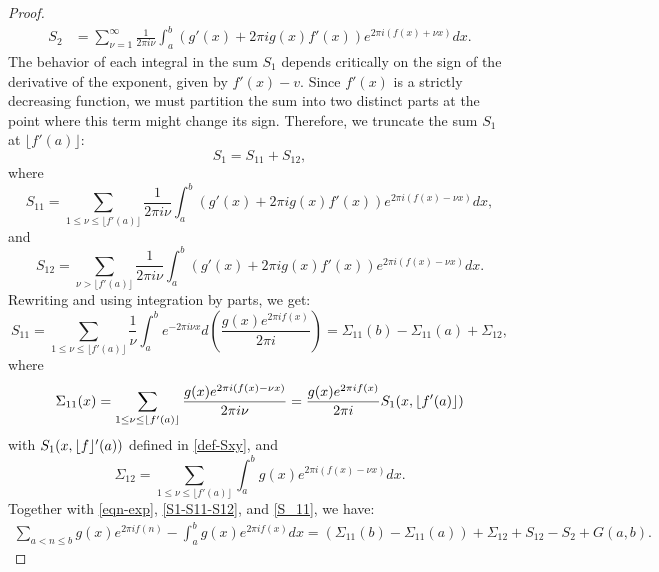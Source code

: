 \documentclass[11pt,letterpaper,oneside,reqno]{amsart}
\DeclarePairedDelimiter\floor{\lfloor}{\rfloor}
\renewcommand{\^}[1]{\widehat{#1}}
\numberwithin{equation}{section}
\theoremstyle{remark}
\begin{document}
\begin{proof}
\begin{align}
    S_2 & = \sum_{\nu=1}^{\infty}\frac{1}{2\pi i \nu}\int_a^b\left(g
    '(x)+2\pi ig(x)f'(x)\right)e^{2\pi i\left(f(x)+\nu x\right)}dx. \label{def-S2}
\end{align}
The behavior of each integral in the sum $S_1$ depends critically on the sign of the derivative of the exponent, given by $f'(x)-v$. Since $f'(x)$ is a strictly decreasing function, we must partition the sum into two distinct parts at the point where this term might change its sign. Therefore,
we truncate the sum $S_1$ at $\lfloor f'(a)\rfloor$:
\begin{equation}
    \label{S1-S11-S12}
    S_1=S_{11}+S_{12},
\end{equation}
where 
\begin{equation}
    S_{11}  = \sum_{1 \leq \nu  \le\lfloor f'(a) \rfloor}\frac{1}{2\pi i \nu}\int_a^b\left(g
    '(x)+2\pi ig(x)f'(x)\right)e^{2\pi i\left(f(x)-\nu x\right)}dx,\label{def-S11}
    \end{equation}
    and
    \begin{equation}
    S_{12}  = \sum_{ \nu  > \lfloor f'(a) \rfloor} \frac{1}{2\pi i \nu}\int_a^b\left(g
    '(x)+2\pi ig(x)f'(x)\right)e^{2\pi i\left(f(x)-\nu x\right)}dx. \label{def-S12}
\end{equation}
%
%
Rewriting and using integration by parts, we get:
 \begin{equation}
S_{11} =
 \sum_{1 \leq \nu  \le\lfloor f'(a) \rfloor} \frac1{\nu}  \int_a^b e^{-2\pi i \nu x } d\left( \frac{g(x) e^{2\pi i f(x)}}{2\pi i} \right)  =   \Sigma_{11}(b)-\Sigma_{11}(a)   +\Sigma_{12} , \label{S_11}
  \end{equation}
        where
\begin{equation}
    \Sigma_{11}(x)
    =  \sum_{1\leq \nu \leq \floor{f'(a)}} \frac{g(x) e^{2\pi i (f(x)-\nu x)}}{2\pi i \nu } 
    = \frac{g(x)e^{2\pi i f(x)}}{2\pi i} {S_1}(x,\floor{f'(a)})\label{def-Sigma11}
\end{equation}
with $S_1(x,\floor f'(a))$ defined in  \eqref{def-Sxy}, and
\begin{equation}
    \Sigma_{12} =   \sum_{1 \leq \nu \le\lfloor f'(a) \rfloor} \int_a^b g(x)e^{2\pi i(f(x)-\nu x)} dx .\label{def-Sigma12}
\end{equation}
%
Together with \eqref{eqn-exp}, \eqref{S1-S11-S12}, and \eqref{S_11}, we have:
\begin{multline}
       \sum_{a<n \leq b}g(x) e^{2\pi i f(n)} - \int_{a}^{b} g(x)e^{2\pi i f(x)} dx = \left( \Sigma_{11}(b)-\Sigma_{11}(a)\right)+\Sigma_{12}+S_{12}-S_2 +G(a,b). \label{sumS1-S2+G} 

\end{multline}
\end{proof}
\end{document}
